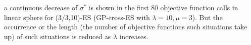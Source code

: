 a continuous decrease of $\sigma^*$ is shown in the first 80 objective function calls in linear sphere for (3/3,10)-ES (GP-cross-ES with $\lambda=10,\mu=3$). But the occurrence or the length (the number of objective functions such situations take up) of such situations is reduced as $\lambda$ increases.












